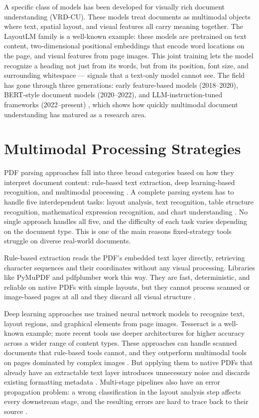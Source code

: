 A specific class of models has been developed for visually rich document
understanding (VRD-CU). These models treat documents as multimodal objects
where text, spatial layout, and visual features all carry meaning together.
The LayoutLM family \autocite{ding2026} is a well-known example: these models are
pretrained on text content, two-dimensional positional embeddings that encode
word locations on the page, and visual features from page images. This joint
training lets the model recognize a heading not just from its words, but from
its position, font size, and surrounding whitespace --- signals that a
text-only model cannot see. The field has gone through three generations:
early feature-based models (2018--2020), BERT-style document models
(2020--2022), and LLM-instruction-tuned frameworks (2022--present)
\autocite{ding2026}, which shows how quickly multimodal document understanding
has matured as a research area.

\section{Multimodal Processing Strategies}

PDF parsing approaches fall into three broad categories based on how they
interpret document content: rule-based text extraction, deep learning-based
recognition, and multimodal processing \autocite{ingemarsson2024}. A complete
parsing system has to handle five interdependent tasks: layout analysis, text
recognition, table structure recognition, mathematical expression recognition,
and chart understanding \autocite{subramani2020}. No single approach handles all
five, and the difficulty of each task varies depending on the document type.
This is one of the main reasons fixed-strategy tools struggle on diverse
real-world documents.

Rule-based extraction reads the PDF's embedded text layer directly, retrieving
character sequences and their coordinates without any visual processing.
Libraries like PyMuPDF and pdfplumber work this way. They are fast,
deterministic, and reliable on native PDFs with simple layouts, but they cannot
process scanned or image-based pages at all and they discard all visual
structure \autocite{meuschke2023}.

Deep learning approaches use trained neural network models to recognize text,
layout regions, and graphical elements from page images. Tesseract is a
well-known example; more recent tools use deeper architectures for higher
accuracy across a wider range of content types. These approaches can handle
scanned documents that rule-based tools cannot, and they outperform multimodal
tools on pages dominated by complex images \autocite{ingemarsson2024}. But
applying them to native PDFs that already have an extractable text layer
introduces unnecessary noise and discards existing formatting metadata
\autocite{meuschke2023}. Multi-stage pipelines also have an error propagation
problem: a wrong classification in the layout analysis step affects every
downstream stage, and the resulting errors are hard to trace back to their
source \autocite{duan2025}.

